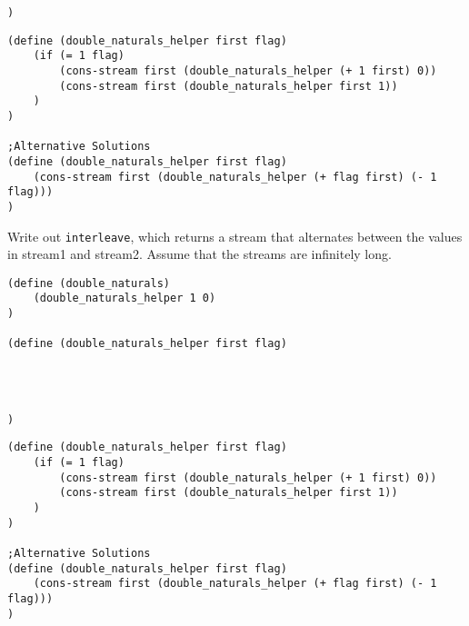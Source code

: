 \documentclass{exam}
\begin{document}
\begin{questions}
\begin{blocksection}
\begin{lstlisting}
)
\end{lstlisting}

\begin{solution}[1in]
\begin{lstlisting}
(define (double_naturals_helper first flag)
    (if (= 1 flag)
        (cons-stream first (double_naturals_helper (+ 1 first) 0))
        (cons-stream first (double_naturals_helper first 1))
    )
)

;Alternative Solutions
(define (double_naturals_helper first flag)
    (cons-stream first (double_naturals_helper (+ flag first) (- 1 flag)))
)
\end{lstlisting}
\end{solution}

\question Write out \texttt{interleave}, which returns a stream that alternates between the values in stream1 and stream2. Assume that the streams are infinitely long.
\begin{lstlisting}
(define (double_naturals)
    (double_naturals_helper 1 0)
)

(define (double_naturals_helper first flag)




)
\end{lstlisting}

\begin{solution}[1in]
\begin{lstlisting}
(define (double_naturals_helper first flag)
    (if (= 1 flag)
        (cons-stream first (double_naturals_helper (+ 1 first) 0))
        (cons-stream first (double_naturals_helper first 1))
    )
)

;Alternative Solutions
(define (double_naturals_helper first flag)
    (cons-stream first (double_naturals_helper (+ flag first) (- 1 flag)))
)
\end{lstlisting}
\end{solution}
\end{blocksection}


\end{questions}
\end{document}
